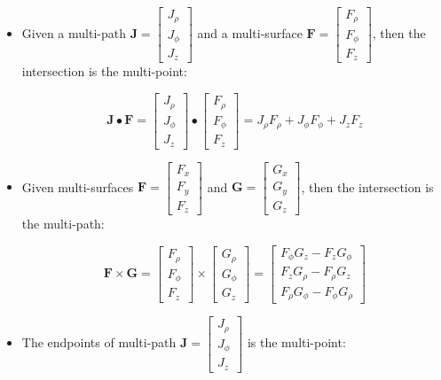 \documentclass{book}
\begin{document}
\begin{itemize}
\item Given a multi-path \(\mathbf{J} = \begin{bmatrix} J_\rho \\ J_\phi \\ J_z \end{bmatrix}\) and a multi-surface \(\mathbf{F} = \begin{bmatrix} F_\rho \\ F_\phi \\ F_z \end{bmatrix}\), then the intersection is the multi-point:

\[\mathbf{J} \bullet \mathbf{F} = \begin{bmatrix} J_\rho \\ J_\phi \\ J_z \end{bmatrix} \bullet \begin{bmatrix} F_\rho \\ F_\phi \\ F_z \end{bmatrix} = J_\rho F_\rho + J_\phi F_\phi + J_z F_z\]
\item Given multi-surfaces \(\mathbf{F} = \begin{bmatrix} F_x \\ F_y \\ F_z \end{bmatrix}\) and \(\mathbf{G} = \begin{bmatrix} G_x \\ G_y \\ G_z \end{bmatrix}\), then the intersection is the multi-path:

\[\mathbf{F} \times \mathbf{G} = \begin{bmatrix} F_\rho \\ F_\phi \\ F_z \end{bmatrix} \times \begin{bmatrix} G_\rho \\ G_\phi \\ G_z \end{bmatrix}
 = \begin{bmatrix} F_\phi G_z - F_z G_\phi \\ F_z G_\rho - F_\rho G_z \\ F_\rho G_\phi - F_\phi G_\rho \end{bmatrix}\]
\item The endpoints of multi-path \(\mathbf{J} = \begin{bmatrix} J_\rho \\ J_\phi \\ J_z \end{bmatrix}\) is the multi-point:


\end{itemize}
\end{document}
